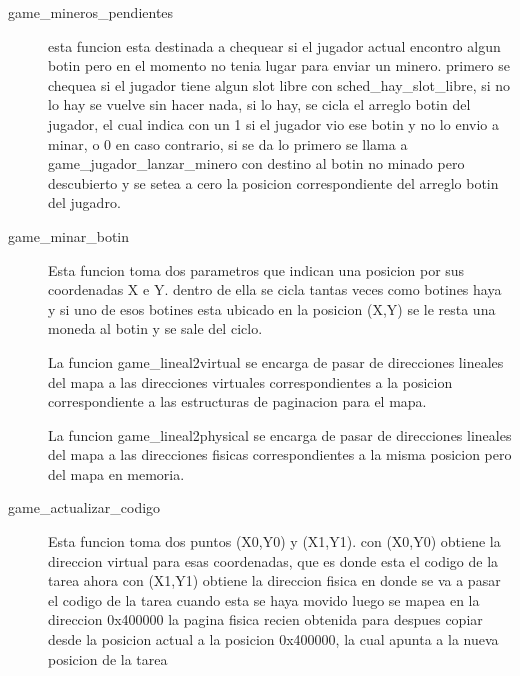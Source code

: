 \begin{description}
\item[game_mineros_pendientes]
  esta funcion esta destinada a chequear si el jugador actual encontro algun botin pero en el momento no tenia lugar para enviar
  un minero.
  primero se chequea si el jugador tiene algun slot libre con sched_hay_slot_libre, si no lo hay se vuelve sin hacer nada,
  si lo hay, se cicla el arreglo botin del jugador, el cual indica con un 1 si el jugador vio ese botin y no lo envio a minar, o
  0 en caso contrario, si se da lo primero se llama a game_jugador_lanzar_minero con destino al botin no minado pero descubierto
  y se setea a cero la posicion correspondiente del arreglo botin del jugadro.

\item[game_minar_botin]
  Esta funcion toma dos parametros que indican una posicion por sus coordenadas X e Y.
  dentro de ella se cicla tantas veces como botines haya y si uno de esos botines esta ubicado en la
  posicion (X,Y) se le resta una moneda al botin y se sale del ciclo.

La funcion game_lineal2virtual se encarga de pasar de direcciones lineales del mapa a las direcciones
virtuales correspondientes a la posicion correspondiente a las estructuras de paginacion para el mapa.

La funcion game_lineal2physical se encarga de pasar de direcciones lineales del mapa a las direcciones
fisicas correspondientes a la misma posicion pero del mapa en memoria.

\item[game_actualizar_codigo]
  Esta funcion toma dos puntos (X0,Y0) y (X1,Y1).
  con (X0,Y0) obtiene la direccion virtual para esas coordenadas, que es donde esta el codigo de la tarea ahora
  con (X1,Y1) obtiene la direccion fisica en donde se va a pasar el codigo de la tarea cuando esta se haya movido
  luego se mapea en la direccion 0x400000 la pagina fisica recien obtenida
  para despues copiar desde la posicion actual a la posicion 0x400000, la cual apunta a la nueva posicion de la tarea


\end{description}
